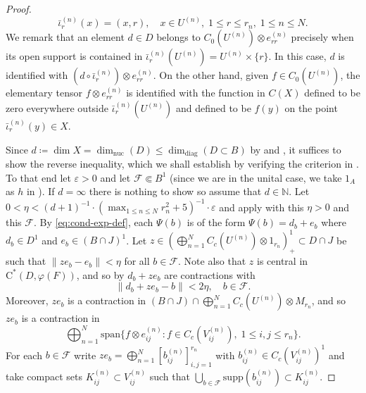 \documentclass[11pt,a4paper]{amsart}
\theoremstyle{definition}
\numberwithin{equation}{section}
\newcommand{\mc}[1]{\mathcal{#1}}
\begin{document}
\begin{proof}
\begin{equation}\label{eq:embeddings}
\bar\iota_r^{(n)}(x)=(x,r),\quad x\in U^{(n)},\; 1\le r\le r_n,\; 1\le n\le N.
\end{equation}
We remark that an element $d\in D$ belongs to $C_0(U^{(n)})\otimes e_{rr}^{(n)}$ precisely when its open support is contained in $\bar\iota_r^{(n)}(U^{(n)})=U^{(n)}\times\{r\}$. In this case, $d$ is identified with $(d\circ\bar\iota_r^{(n)})\otimes e_{rr}^{(n)}$. On the other hand, given $f\in C_0(U^{(n)})$, the elementary tensor $f\otimes e_{rr}^{(n)}$ is identified with the function in $C(X)$ defined to be zero everywhere outside $\bar\iota_r^{(n)}(U^{(n)})$ and defined to be $f(y)$ on the point $\bar\iota_r^{(n)}(y)\in X$.


Since $d\coloneqq \dim X=\dim_\mathrm{nuc}(D)\le \dim_\mathrm{diag}(D\subset B)$ by \cite[Proposition~2.4]{WinZac10} and \cite[Remarks~2.2]{LiLiaWin23}, it suffices to show the reverse inequality, which we shall establish by verifying the criterion in \cite[Proposition~2.3]{LiLiaWin23}. To that end let $\varepsilon>0$ and let $\mc{F}\Subset B^1$ (since we are in the unital case, we take $1_A$ as $h$ in \cite[Proposition~2.3]{LiLiaWin23}). If $d=\infty$ there is nothing to show so assume that $d\in\mathbb{N}$. Let $0<\eta<(d+1)^{-1}\cdot (\max_{1\le n\le N}r_n^2 + 5)^{-1}\cdot \varepsilon$ and apply  with this $\eta>0$ and this $\mathcal{F}$.  By \eqref{eq:cond-exp-def}, each $\Psi(b)$ is of the form $\Psi(b) =  d_b + e_b$ where $d_b\in D^1$ and $e_b\in (B\cap J)^1$. Let $z\in (\bigoplus_{n=1}^N C_c(U^{(n)})\otimes 1_{r_n})_+^1\subset D\cap J$ be such that $\|ze_b-e_b\|<\eta$ for all $b\in\mathcal{F}$. Note also that $z$ is central in $\mathrm{C}^\ast(D,\varphi(F))$, and so by  $d_b+ze_b$ are contractions with 
\begin{equation}
\|d_b+ze_b - b\|<2\eta,\quad b\in\mathcal{F}.
\end{equation}
Moreover, $ze_b$ is a contraction in $ (B\cap J)\cap \bigoplus_{n=1}^NC_c(U^{(n)})\otimes M_{r_n}$, and so $ze_b$ is a contraction in
\begin{equation*}
\bigoplus_{n=1}^N\mathrm{span}\{f\otimes e_{ij}^{(n)}: f\in C_c(V_{ij}^{(n)}),\; 1\le i,j\le r_n\}.
\end{equation*}
For each $b\in\mc{F}$ write $ze_b = \bigoplus_{n=1}^N[b_{ij}^{(n)}]_{i,j=1}^{r_n}$ with $b_{ij}^{(n)}\in C_c(V_{ij}^{(n)})^1$ and take compact sets $K_{ij}^{(n)}\subset V_{ij}^{(n)}$ such that $\bigcup_{b\in\mathcal{F}}\mathrm{supp}(b_{ij}^{(n)})\subset K_{ij}^{(n)}$. 


\end{proof}
\end{document}
